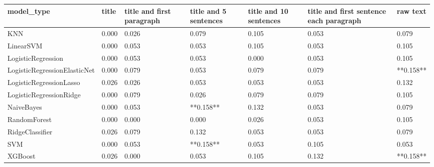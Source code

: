 \begin{tabular}{lllllll}
\toprule
                  model\_type & title & title and first paragraph & title and 5 sentences & title and 10 sentences & title and first sentence each paragraph &  raw text \\
\midrule
                         KNN & 0.000 &                     0.026 &                 0.079 &                  0.105 &                                   0.053 &     0.079 \\
                   LinearSVM & 0.000 &                     0.053 &                 0.053 &                  0.105 &                                   0.053 &     0.105 \\
          LogisticRegression & 0.000 &                     0.053 &                 0.053 &                  0.000 &                                   0.053 &     0.105 \\
LogisticRegressionElasticNet & 0.000 &                     0.079 &                 0.053 &                  0.079 &                                   0.079 & **0.158** \\
     LogisticRegressionLasso & 0.026 &                     0.026 &                 0.053 &                  0.053 &                                   0.053 &     0.132 \\
     LogisticRegressionRidge & 0.000 &                     0.079 &                 0.026 &                  0.079 &                                   0.079 &     0.105 \\
                  NaiveBayes & 0.000 &                     0.053 &             **0.158** &                  0.132 &                                   0.053 &     0.079 \\
                RandomForest & 0.000 &                     0.000 &                 0.000 &                  0.026 &                                   0.053 &     0.105 \\
             RidgeClassifier & 0.026 &                     0.079 &                 0.132 &                  0.053 &                                   0.053 &     0.079 \\
                         SVM & 0.000 &                     0.053 &             **0.158** &                  0.053 &                                   0.105 &     0.053 \\
                     XGBoost & 0.026 &                     0.000 &                 0.053 &                  0.105 &                                   0.132 & **0.158** \\
\bottomrule
\end{tabular}
